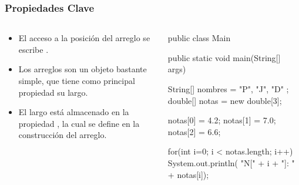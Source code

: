 \documentclass{beamer}
\begin{document}
\begin{frame}[fragile]
  \frametitle{Propiedades Clave}

  \begin{columns}
    \begin{column}{0.4\textwidth}
      \begin{small}
        \begin{itemize}

        \item El acceso a la posición  del arreglo  se
          escribe .
          
        \item Los arreglos son un objeto bastante simple, que tiene como
          principal propiedad su largo.
          
        \item El largo está almacenado en la propiedad , la
          cual se define en la construcción del arreglo.
          
        \end{itemize}
      \end{small}
    \end{column}
    \begin{column}{0.6\textwidth}
      \begin{jsmall}
        public class Main {
          public static void main(String[] args) {
            
            String[] nombres = { "P", "J", "D" };
            double[] notas   = new double[3];
            
            notas[0] = 4.2;
            notas[1] = 7.0;
            notas[2] = 6.6;
            
            for(int i=0; i < notas.length; i++) {
              System.out.println(
              "N[" + i + "]: " + notas[i]);
            }
          }
        }
      \end{jsmall}      
    \end{column}
  \end{columns}

\end{frame}
\end{document}
